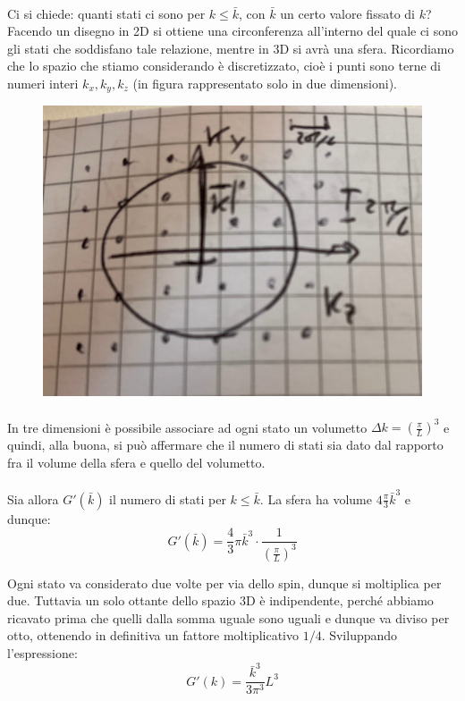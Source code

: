 \documentclass{book}
\begin{document}
            \paragraph{}
                Ci si chiede: quanti stati ci sono per $k \leq \bar{k}$, con $\bar{k}$ un certo valore fissato di $k$? Facendo un disegno in 2D si ottiene una circonferenza all'interno del quale ci sono gli stati che soddisfano tale relazione, mentre in 3D si avrà una sfera. Ricordiamo che lo spazio che stiamo considerando è discretizzato, cioè i punti sono terne di numeri interi $k_{x}, k_{y}, k_{z}$ (in figura rappresentato solo in due dimensioni).
               \newpage
                \begin{figure}[h!]
                    \centering
                    \includegraphics[width=0.5\linewidth]{img/spazioDiFermiLez12.png}
                \end{figure}
                \paragraph{}
                In tre dimensioni è possibile associare ad ogni stato un volumetto $\displaystyle \Delta k = (\frac{\pi}{L})^{3}$ e quindi, alla buona, si può affermare che il numero di stati sia dato dal rapporto fra il volume della sfera e quello del volumetto.

                \paragraph{}
                    Sia allora $G'(\bar{k})$ il numero di stati per $k \leq \bar{k}$. La sfera ha volume $\displaystyle 4 \frac{\pi}{3}\bar{k}^{3}$ e dunque:
                    $$G'(\bar{k}) = \frac{4}{3}\pi\bar{k}^{3} \cdot \frac{1}{(\frac{\pi}{L})^{3}}$$

                    Ogni stato va considerato due volte per via dello spin, dunque si moltiplica per due. Tuttavia un solo ottante dello spazio 3D è indipendente, perché abbiamo ricavato prima che quelli dalla somma uguale sono uguali e dunque va diviso per otto, ottenendo in definitiva un fattore moltiplicativo $1/4$. Sviluppando l'espressione:
                    $$G'(k) = \frac{\bar{k}^{3}}{3 \pi^{3}}L^{3}$$
\end{document}
